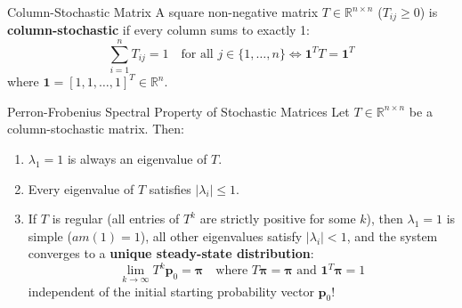\begin{definitionbox}{Column-Stochastic Matrix}
A square non-negative matrix $T \in \mathbb{R}^{n \times n}$ ($T_{ij} \ge 0$) is \textbf{column-stochastic} if every column sums to exactly 1:
\begin{equation}
\sum_{i=1}^n T_{ij} = 1 \quad \text{for all } j \in \{1, \dots, n\} \iff \mathbf{1}^T T = \mathbf{1}^T
\end{equation}
where $\mathbf{1} = [1, 1, \dots, 1]^T \in \mathbb{R}^n$.
\end{definitionbox}

\begin{theorembox}{Perron-Frobenius Spectral Property of Stochastic Matrices}
Let $T \in \mathbb{R}^{n \times n}$ be a column-stochastic matrix. Then:
\begin{enumerate}
    \item $\lambda_1 = 1$ is always an eigenvalue of $T$.
    \item Every eigenvalue of $T$ satisfies $|\lambda_i| \le 1$.
    \item If $T$ is regular (all entries of $T^k$ are strictly positive for some $k$), then $\lambda_1 = 1$ is simple ($am(1) = 1$), all other eigenvalues satisfy $|\lambda_i| < 1$, and the system converges to a \textbf{unique steady-state distribution}:
    \begin{equation}
    \lim_{k \to \infty} T^k \mathbf{p}_0 = \boldsymbol{\pi} \quad \text{where } T\boldsymbol{\pi} = \boldsymbol{\pi} \text{ and } \mathbf{1}^T \boldsymbol{\pi} = 1
    \end{equation}
    independent of the initial starting probability vector $\mathbf{p}_0$!
\end{enumerate}
\end{theorembox}

